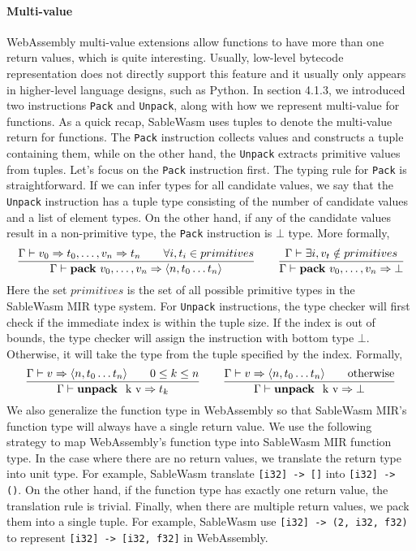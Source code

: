 \paragraph{Multi-value}
WebAssembly multi-value extensions allow functions to have more than one return
values, which is quite interesting. Usually, low-level bytecode representation
does not directly support this feature and it usually only appears in
higher-level language designs, such as Python. In section 4.1.3, we introduced
two instructions \texttt{Pack} and \texttt{Unpack}, along with how we represent
multi-value for functions. As a quick recap, SableWasm uses tuples to denote the
multi-value return for functions. The \texttt{Pack} instruction collects values
and constructs a tuple containing them, while on the other hand, the
\texttt{Unpack} extracts primitive values from tuples. Let's focus on the
\texttt{Pack} instruction first. The typing rule for \texttt{Pack} is
straightforward. If we can infer types for all candidate values, we say that the
\texttt{Unpack} instruction has a tuple type consisting of the number of
candidate values and a list of element types. On the other hand, if any of the
candidate values result in a non-primitive type, the \texttt{Pack} instruction
is $\bot$ type. More formally,
$$
    \frac
    {\Gamma \vdash v_0 \Rightarrow t_0, \dots, v_n \Rightarrow t_n \qquad \forall i, t_i \in primitives}
    {\Gamma \vdash \text{\textbf{pack} } v_0, \dots, v_n \Rightarrow \langle n, t_0 \dots t_n \rangle}
    \qquad
    \frac
    {\Gamma \vdash \exists i, v_t \notin primitives}
    {\Gamma \vdash \text{\textbf{pack} } v_0, \dots, v_n \Rightarrow \bot}
$$
Here the set $primitives$ is the set of all possible primitive types in the
SableWasm MIR type system. For \texttt{Unpack} instructions, the type checker
will first check if the immediate index is within the tuple size. If the index
is out of bounds, the type checker will assign the instruction with bottom type
$\bot$. Otherwise, it will take the type from the tuple specified by the index.
Formally,
$$
    \frac
    {\Gamma \vdash v \Rightarrow \langle n, t_0 \dots t_n \rangle \qquad 0 \leq k \leq n}
    {\Gamma \vdash \text{\textbf{unpack } k v} \Rightarrow t_k}
    \qquad
    \frac
    {\Gamma \vdash v \Rightarrow \langle n, t_0 \dots t_n \rangle \qquad \text{otherwise}}
    {\Gamma \vdash \text{\textbf{unpack } k v} \Rightarrow \bot}
$$
We also generalize the function type in WebAssembly so that SableWasm MIR's
function type will always have a single return value. We use the following
strategy to map WebAssembly's function type into SableWasm MIR function type.
In the case where there are no return values, we translate the return type into
unit type. For example, SableWasm translate \texttt{[i32] -> []} into
\texttt{[i32] -> ()}. On the other hand, if the function type has exactly one
return value, the translation rule is trivial. Finally, when there are multiple
return values, we pack them into a single tuple. For example, SableWasm use
\texttt{[i32] -> (2, i32, f32)} to represent \texttt{[i32] -> [i32, f32]} in
WebAssembly.

